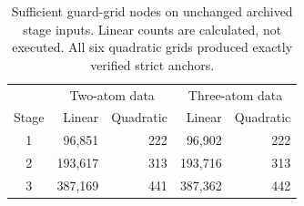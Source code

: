 \begin{table}[tb]
\centering
\caption{Sufficient guard-grid nodes on unchanged archived stage inputs. Linear counts are calculated, not executed. All six quadratic grids produced exactly verified strict anchors.}\label{tab:guard}
\begin{tabular}{crrrr}\toprule
 & \multicolumn{2}{c}{Two-atom data} & \multicolumn{2}{c}{Three-atom data} \\
Stage & Linear & Quadratic & Linear & Quadratic \\\midrule
1 & 96,851 & 222 & 96,902 & 222 \\
2 & 193,617 & 313 & 193,716 & 313 \\
3 & 387,169 & 441 & 387,362 & 442 \\
\bottomrule\end{tabular}
\end{table}
